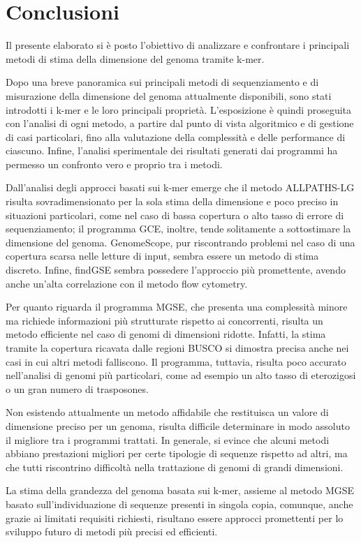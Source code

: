 \documentclass[crop=false, class=book]{standalone}
\begin{document}
	\chapter*{Conclusioni}

	Il presente elaborato si è posto l'obiettivo di analizzare e confrontare i principali metodi di stima della dimensione del genoma tramite k-mer.
	
	Dopo una breve panoramica sui principali metodi di sequenziamento e di misurazione della dimensione del genoma attualmente disponibili, sono stati introdotti i k-mer e le loro principali proprietà. L'esposizione è quindi proseguita con l'analisi di ogni metodo, a partire dal punto di vista algoritmico e di gestione di casi particolari, fino alla valutazione della complessità e delle performance di ciascuno. Infine, l'analisi sperimentale dei risultati generati dai programmi ha permesso un confronto vero e proprio tra i metodi.
	
	Dall'analisi degli approcci basati sui k-mer emerge che il metodo ALLPATHS-LG risulta sovradimensionato per la sola stima della dimensione e poco preciso in situazioni particolari, come nel caso di bassa copertura o alto tasso di errore di sequenziamento; il programma GCE, inoltre, tende solitamente a sottostimare la dimensione del genoma. GenomeScope, pur riscontrando problemi nel caso di una copertura scarsa nelle letture di input, sembra essere un metodo di stima discreto. Infine, findGSE sembra possedere l'approccio più promettente, avendo anche un'alta correlazione con il metodo flow cytometry.
	
	Per quanto riguarda il programma MGSE, che presenta una complessità minore ma richiede informazioni più strutturate rispetto ai concorrenti, risulta un metodo efficiente nel caso di genomi di dimensioni ridotte. Infatti, la stima tramite la copertura ricavata dalle regioni BUSCO si dimostra precisa anche nei casi in cui altri metodi falliscono. Il programma, tuttavia, risulta poco accurato nell'analisi di genomi più particolari, come ad esempio un alto tasso di eterozigosi o un gran numero di \glspl{trasposone}. 
	
	Non esistendo attualmente un metodo affidabile che restituisca un valore di dimensione preciso per un genoma, risulta difficile determinare in modo assoluto il migliore tra i programmi trattati. In generale, si evince che alcuni metodi abbiano prestazioni migliori per certe tipologie di sequenze rispetto ad altri, ma che tutti riscontrino difficoltà nella trattazione di genomi di grandi dimensioni. 
	
	La stima della grandezza del genoma basata sui k-mer, assieme al metodo MGSE basato sull'individuazione di sequenze presenti in singola copia, comunque, anche grazie ai limitati requisiti richiesti, risultano essere approcci promettenti per lo sviluppo futuro di metodi più precisi ed efficienti.
	
	
	
\end{document}
